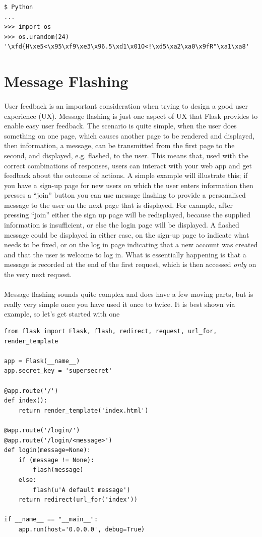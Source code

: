 \documentclass[12pt, a4paper, oneside]{book}
\begin{document}
\begin{lstlisting}
$ Python
...
>>> import os
>>> os.urandom(24)
'\xfd{H\xe5<\x95\xf9\xe3\x96.5\xd1\x01O<!\xd5\xa2\xa0\x9fR"\xa1\xa8'
\end{lstlisting}


\section{Message Flashing}
\label{message-flashing}
\paragraph{} User feedback is an important consideration when trying to design a good user experience (UX). Message flashing is just one aspect of UX that Flask provides to enable easy user feedback. The scenario is quite simple, when the user does something on one page, which causes another page to be rendered and displayed, then information, a message, can be transmitted from the first page to the second, and displayed, e.g. flashed, to the user. This means that, used with the correct combinations of responses, users can interact with your web app and get feedback about the outcome of actions. A simple example will illustrate this; if you have a sign-up page for new users on which the user enters information then presses a ``join'' button you can use message flashing to provide a personalised message to the user on the next page that is displayed. For example, after pressing ``join'' either the sign up page will be redisplayed, because the supplied information is insufficient, or else the login page will be displayed. A flashed message could be displayed in either case, on the sign-up page to indicate what needs to be fixed, or on the log in page indicating that a new account was created and that the user is welcome to log in. What is essentially happening is that a message is recorded at the end of the first request, which is then accessed \emph{only} on the very next request.

\paragraph{} Message flashing sounds quite complex and does have a few moving parts, but is really very simple once you have used it once to twice. It is best shown via example, so let's get started with one

\begin{lstlisting}
from flask import Flask, flash, redirect, request, url_for, render_template

app = Flask(__name__)
app.secret_key = 'supersecret'

@app.route('/')
def index():
    return render_template('index.html')

@app.route('/login/')
@app.route('/login/<message>')
def login(message=None):
    if (message != None):
        flash(message)
    else:
        flash(u'A default message')
    return redirect(url_for('index'))

if __name__ == "__main__":
    app.run(host='0.0.0.0', debug=True)
\end{lstlisting}
\end{document}
